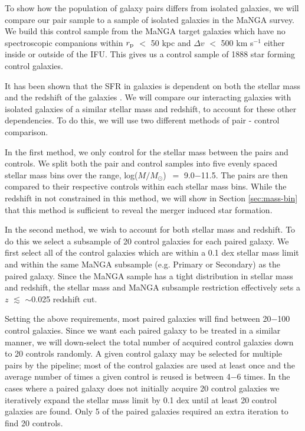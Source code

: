 \documentclass[iop,revtex4,twocolumn,apj,numberedappendix,appendixfloats]{emulateapj}
\newcommand{\logm}{log($M/M_{\odot}$)}
\begin{document}
To show how the population of galaxy pairs differs from isolated galaxies, we will compare our pair sample to a sample of isolated galaxies in the MaNGA survey. We build this control sample from the MaNGA target galaxies which have no spectroscopic companions within $r_{\rm p}$ $<$ 50 kpc and $\Delta v$ $<$ 500 km s$^{-1}$ either inside or outside of the IFU. This gives us a control sample of 1888 star forming control galaxies. 

It has been shown that the SFR in galaxies is dependent on both the stellar mass and the redshift of the galaxies \citep{Noeske:2007}. We will compare our interacting galaxies with isolated galaxies of a similar stellar mass and redshift, to account for these other dependencies. To do this, we will use two different methods of pair - control comparison. 

In the first method, we only control for the stellar mass between the pairs and controls. We split both the pair and control samples into five evenly spaced stellar mass bins over the range, \logm\ $=$ 9.0$-$11.5. The pairs are then compared to their respective controls within each stellar mass bins. While the redshift in not constrained in this method, we will show in Section \ref{sec:mass-bin} that this method is sufficient to reveal the merger induced star formation. 


In the second method, we wish to account for both stellar mass and redshift. To do this we select a subsample of 20 control galaxies for each paired galaxy. We first select all of the control galaxies which are within a 0.1 dex stellar mass limit and within the same MaNGA subsample (e.g. Primary or Secondary) as the paired galaxy. Since the MaNGA sample has a tight distribution in stellar mass and redshift, the stellar mass and MaNGA subsample restriction effectively sets a $z$ $\lesssim$ $\sim$0.025 redshift cut. 

Setting the above requirements, most paired galaxies will find between 20$-$100 control galaxies. Since we want each paired galaxy to be treated in a similar manner, we will down-select the total number of acquired control galaxies down to 20 controls randomly. A given control galaxy may be selected for multiple pairs by the pipeline; most of the control galaxies are used at least once and the average number of times a given control is reused is between 4$-$6 times. In the cases where a paired galaxy does not initially acquire 20 control galaxies we iteratively expand the stellar mass limit by 0.1 dex until at least 20 control galaxies are found. Only 5 of the paired galaxies required an extra iteration to find 20 controls. 
\end{document}
